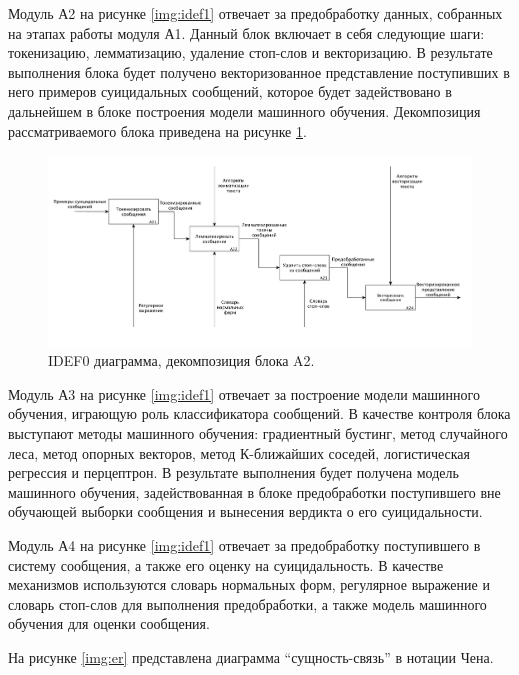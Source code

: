 Модуль А2 на рисунке \ref{img:idef1} отвечает за предобработку данных, собранных на этапах работы модуля А1. 
Данный блок включает в себя следующие шаги: токенизацию, лемматизацию, удаление стоп-слов и векторизацию.
В результате выполнения блока будет получено векторизованное представление поступивших в него примеров суицидальных сообщений, которое будет задействовано в дальнейшем в блоке построения модели машинного обучения.
Декомпозиция рассматриваемого блока приведена на рисунке \ref{img:idef21}.

\begin{figure}[H]
	\centering
	\includegraphics[width=\textwidth]{inc/A21.pdf}
	\caption{ IDEF0 диаграмма, декомпозиция блока A2. }
	\label{img:idef21}
\end{figure}

Модуль А3 на рисунке \ref{img:idef1} отвечает за построение модели машинного обучения, играющую роль классификатора сообщений. 
В качестве контроля блока выступают методы машинного обучения: градиентный бустинг, метод случайного леса, метод опорных векторов, метод К-ближайших соседей, логистическая регрессия и перцептрон.
В результате выполнения будет получена модель машинного обучения, задействованная в блоке предобработки поступившего вне обучающей выборки сообщения и вынесения вердикта о его суицидальности.

Модуль А4 на рисунке \ref{img:idef1} отвечает за предобработку поступившего в систему сообщения, а также его оценку на суицидальность. 
В качестве механизмов используются словарь нормальных форм, регулярное выражение и словарь стоп-слов для выполнения предобработки, а также модель машинного обучения для оценки сообщения.

На рисунке \ref{img:er} представлена диаграмма ``сущность-связь'' в нотации Чена.

